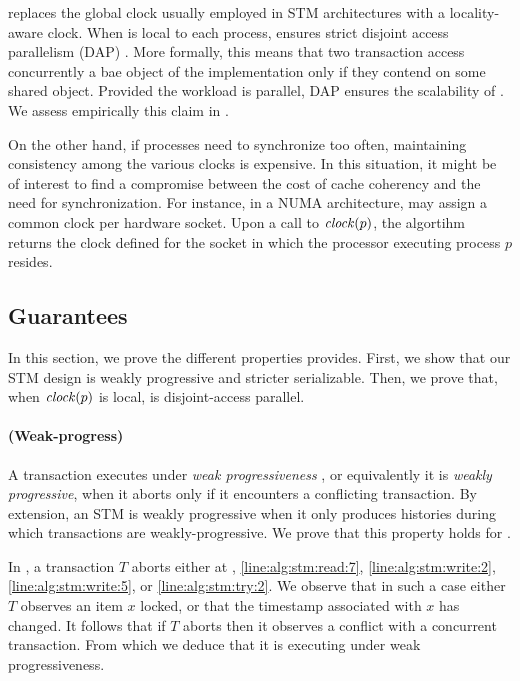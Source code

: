  replaces the global clock usually employed in STM architectures with a locality-aware clock.
When  is local to each process,  ensures strict disjoint access parallelism (DAP) \cite{Attiya2015}.
More formally, this means that two transaction access concurrently a bae object of the implementation only if they contend on some shared object.
Provided the workload is parallel, DAP ensures the scalability of .
We assess empirically this claim in .

On the other hand, if processes need to synchronize too often, maintaining consistency among the various clocks is expensive.
In this situation, it might be of interest to find a compromise between the cost of cache coherency and the need for synchronization.
For instance, in a NUMA architecture,  may assign a common clock per hardware socket.
Upon a call to $\clockOf{p}$, the algortihm returns the clock defined for the socket in which the processor executing process $p$ resides.

\subsection{Guarantees}

In this section, we prove the different properties  provides.
First, we show that our STM design is weakly progressive and stricter serializable.
Then, we prove that, when $\clockOf{p}$ is local,  is disjoint-access parallel.

\paragraph{(Weak-progress)}
A transaction executes under \emph{weak progressiveness} \cite{Guerraoui:2009}, or equivalently it is \emph{weakly progressive}, when it aborts only if it encounters a conflicting transaction.
By extension, an STM is weakly progressive when it only produces histories during which transactions are weakly-progressive.
We prove that this property holds for .

In , a transaction $T$ aborts either at , \ref{line:alg:stm:read:7}, \ref{line:alg:stm:write:2}, \ref{line:alg:stm:write:5}, or \ref{line:alg:stm:try:2}.
We observe that in such a case either $T$ observes an item $x$ locked, or that the timestamp associated with $x$ has changed.
It follows that if $T$ aborts then it observes a conflict with a concurrent transaction.
From which we deduce that it is executing under weak progressiveness.

